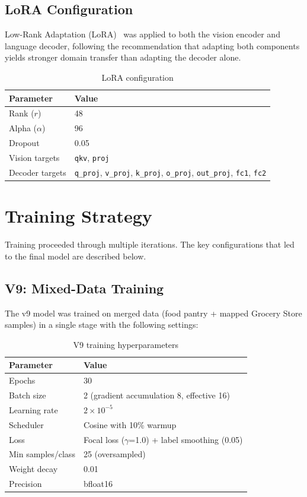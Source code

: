 \documentclass[11pt]{article}
\begin{document}
\subsection{LoRA Configuration}

Low-Rank Adaptation (LoRA)~\cite{hu2021lora} was applied to both the vision encoder and language decoder, following the recommendation that adapting both components yields stronger domain transfer than adapting the decoder alone.

\begin{table}[h]
\centering
\caption{LoRA configuration}
\begin{tabular}{ll}
\toprule
Parameter & Value \\
\midrule
Rank ($r$) & 48 \\
Alpha ($\alpha$) & 96 \\
Dropout & 0.05 \\
Vision targets & \texttt{qkv}, \texttt{proj} \\
Decoder targets & \texttt{q\_proj}, \texttt{v\_proj}, \texttt{k\_proj}, \texttt{o\_proj}, \texttt{out\_proj}, \texttt{fc1}, \texttt{fc2} \\
\bottomrule
\end{tabular}
\end{table}

\section{Training Strategy}

Training proceeded through multiple iterations. The key configurations that led to the final model are described below.

\subsection{V9: Mixed-Data Training}

The v9 model was trained on merged data (food pantry + mapped Grocery Store samples) in a single stage with the following settings:

\begin{table}[h]
\centering
\caption{V9 training hyperparameters}
\begin{tabular}{ll}
\toprule
Parameter & Value \\
\midrule
Epochs & 30 \\
Batch size & 2 (gradient accumulation 8, effective 16) \\
Learning rate & $2 \times 10^{-5}$ \\
Scheduler & Cosine with 10\% warmup \\
Loss & Focal loss ($\gamma$=1.0) + label smoothing (0.05) \\
Min samples/class & 25 (oversampled) \\
Weight decay & 0.01 \\
Precision & bfloat16 \\
\bottomrule
\end{tabular}
\end{table}
\end{document}
